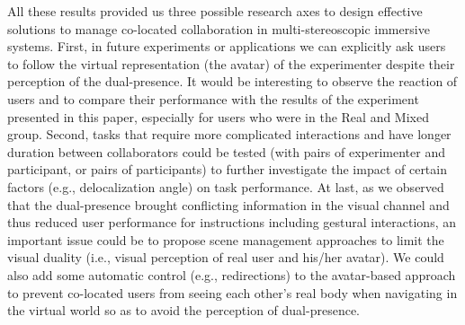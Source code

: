 All these results provided us three possible research axes to design effective solutions to manage co-located collaboration in multi-stereoscopic immersive systems. First, in future experiments or applications we can explicitly ask users to follow the virtual representation (the avatar) of the experimenter despite their perception of the dual-presence. It would be interesting to observe the reaction of users and to compare their performance with the results of the experiment presented in this paper, especially for users who were in the Real and Mixed group. Second, tasks that require more complicated interactions and have longer duration between collaborators could be tested (with pairs of experimenter and participant, or pairs of participants) to further investigate the impact of certain factors (e.g., delocalization angle) on task performance. At last, as we observed that the dual-presence brought conflicting information in the visual channel and thus reduced user performance for instructions including gestural interactions, an important issue could be to propose scene management approaches to limit the visual duality (i.e., visual perception of real user and his/her avatar). We could also add some automatic control (e.g., redirections) to the avatar-based approach to prevent co-located users from seeing each other's real body when navigating in the virtual world so as to avoid the perception of dual-presence.